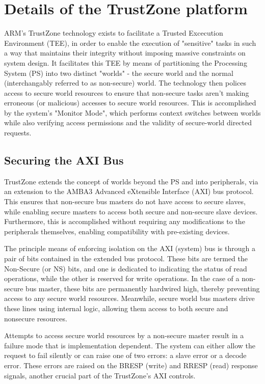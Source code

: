 \documentclass[journal]{IEEEtran}
\begin{document}
\section{Details of the TrustZone platform}
ARM's TrustZone technology exists to facilitate a Trusted Excecution Environment (TEE), in
order to enable the execution of "sensitive" tasks in such a way that maintains their
integrity without imposing massive constraints on system design. It facilitates this TEE
by means of partitioning the Processing System (PS) into two distinct "worlds" - the
secure world and the normal (interchangably referred to as non-secure) world. The
technology then polices access to secure world resources to ensure that non-secure tasks
aren't making erroneous (or malicious) accesses to secure world resources. This is
accomplished by the system's "Monitor Mode", which performs context switches between worlds
while also verifying access permissions and the validity of secure-world directed requests.

\subsection{Securing the AXI Bus}
TrustZone extends the concept of worlds beyond the PS and into peripherals,
via an extension to the AMBA3 Advanced eXtensible Interface (AXI) bus protocol. This
ensures that non-secure bus masters do not have access to secure slaves, while enabling
secure masters to access both secure and non-secure slave devices. Furthermore, this is
accomplished without requiring any modifications to the peripherals themselves, enabling
compatibility with pre-existing devices.

The principle means of enforcing isolation on the AXI (system) bus is through a pair of
bits contained in the extended bus protocol. These bits are termed the Non-Secure (or NS)
bits, and one is dedicated to indicating the status of read operations, while the other is
reserved for write operations.\cite{benhani_security_2019} In the case of a non-secure bus
master, these bits are permanently hardwired high, thereby preventing access to any 
secure world resources. Meanwhile, secure world bus masters drive these lines using 
internal logic, allowing them access to both secure and nonsecure resources.

Attempts to access secure world resources by a non-secure master result in a failure mode
that is implementation dependent. The system can either allow the request to fail silently
or can raise one of two errors: a slave error or a decode error. These errors are raised
on the BRESP (write) and RRESP (read) response signals, another crucial part of the 
TrustZone's AXI controls. \cite{benhani_security_2017}
\end{document}
